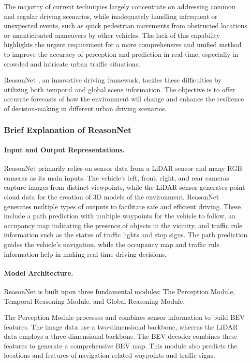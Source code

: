 The majority of current techniques largely concentrate on addressing common and regular driving scenarios, while inadequately handling infrequent or unexpected events, such as quick pedestrian movements from obstructed locations or unanticipated maneuvers by other vehicles. The lack of this capability highlights the urgent requirement for a more comprehensive and unified method to improve the accuracy of perception and prediction in real-time, especially in crowded and intricate urban traffic situations.

ReasonNet \cite{shao2023reasonnet}, an innovative driving framework, tackles these difficulties by utilizing both temporal and global scene information. The objective is to offer accurate forecasts of how the environment will change and enhance the resilience of decision-making in different urban driving scenarios.

\subsubsection{Brief Explanation of ReasonNet}

\paragraph{Input and Output Representations.} ReasonNet primarily relies on sensor data from a LiDAR sensor and many RGB cameras as its main inputs. The vehicle's left, front, right, and rear cameras capture images from distinct viewpoints, while the LiDAR sensor generates point cloud data for the creation of 3D models of the environment. ReasonNet generates multiple types of outputs to facilitate safe and efficient driving. These include a path prediction with multiple waypoints for the vehicle to follow, an occupancy map indicating the presence of objects in the vicinity, and traffic rule information such as the status of traffic lights and stop signs. The path prediction guides the vehicle's navigation, while the occupancy map and traffic rule information help in making real-time driving decisions.

\paragraph{Model Architecture.} ReasonNet is built upon three fundamental modules: The Perception Module, Temporal Reasoning Module, and Global Reasoning Module.

The Perception Module processes and combines sensor information to build BEV features. The image data use a two-dimensional backbone, whereas the LiDAR data employs a three-dimensional backbone. The BEV decoder combines these features to generate a comprehensive BEV map. This module also predicts the locations and features of navigation-related waypoints and traffic signs.

